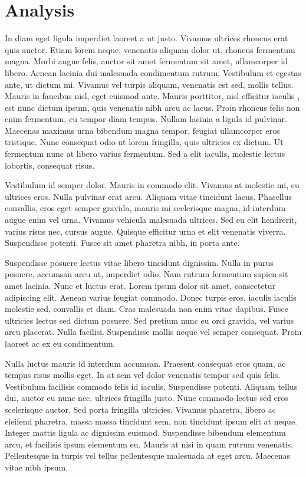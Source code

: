 \documentclass[11pt,a4paper]{article}
\begin{document}
\section{Analysis}

In diam eget ligula imperdiet laoreet a ut justo. Vivamus ultrices rhoncus erat quis auctor. Etiam lorem neque, venenatis aliquam dolor ut, rhoncus fermentum magna. Morbi augue felis, auctor sit amet fermentum sit amet, ullamcorper id libero. Aenean lacinia dui malesuada condimentum rutrum. Vestibulum et egestas ante, ut dictum mi. Vivamus vel turpis aliquam, venenatis est sed, mollis tellus. Mauris in faucibus nisl, eget euismod ante. Mauris porttitor, nisl efficitur iaculis \cite{BBD2013}, est nunc dictum ipsum, quis venenatis nibh arcu ac lacus. Proin rhoncus felis non enim fermentum, eu tempor diam tempus. Nullam lacinia a ligula id pulvinar. Maecenas maximus urna bibendum magna tempor, feugiat ullamcorper eros tristique. Nunc consequat odio ut lorem fringilla, quis ultricies ex dictum. Ut fermentum nunc at libero varius fermentum. Sed a elit iaculis, molestie lectus lobortis, consequat risus.

Vestibulum id semper dolor. Mauris in commodo elit. Vivamus at molestie mi, eu ultrices eros. Nulla pulvinar erat arcu. Aliquam vitae tincidunt lacus. Phasellus convallis, eros eget semper gravida, mauris mi scelerisque magna, id interdum augue enim vel urna. Vivamus vehicula malesuada ultrices. Sed eu elit hendrerit, varius risus nec, cursus augue. Quisque efficitur urna et elit venenatis viverra. Suspendisse potenti. Fusce sit amet pharetra nibh, in porta ante.

Suspendisse posuere lectus vitae libero tincidunt dignissim. Nulla in purus posuere, accumsan arcu ut, imperdiet odio. Nam rutrum fermentum sapien sit amet lacinia. Nunc et luctus erat. Lorem ipsum dolor sit amet, consectetur adipiscing elit. Aenean varius feugiat commodo. Donec turpis eros, iaculis iaculis molestie sed, convallis et diam. Cras malesuada non enim vitae dapibus. Fusce ultricies lectus sed dictum posuere. Sed pretium nunc eu orci gravida, vel varius arcu placerat. Nulla facilisi. Suspendisse mollis neque vel semper consequat. Proin laoreet ac ex eu condimentum.

Nulla luctus mauris id interdum accumsan. Praesent consequat eros quam, ac tempus risus mollis eget. In at sem vel dolor venenatis tempor sed quis felis. Vestibulum facilisis commodo felis id iaculis. Suspendisse potenti. Aliquam tellus dui, auctor eu nunc nec, ultrices fringilla justo. Nunc commodo lectus sed eros scelerisque auctor. Sed porta fringilla ultricies. Vivamus pharetra, libero ac eleifend pharetra, massa massa tincidunt sem, non tincidunt ipsum elit at neque. Integer mattis ligula ac dignissim euismod. Suspendisse bibendum elementum arcu, et facilisis ipsum elementum eu. Mauris at nisi in quam rutrum venenatis. Pellentesque in turpis vel tellus pellentesque malesuada at eget arcu. Maecenas vitae nibh ipsum.
\end{document}
